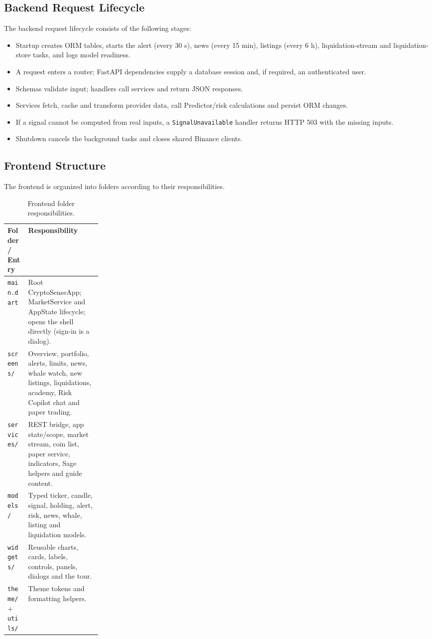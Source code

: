 \subsection{Backend Request Lifecycle}
The backend request lifecycle consists of the following stages:
\begin{itemize}
\item Startup creates ORM tables, starts the alert (every 30 s), news (every 15 min), listings (every 6 h), liquidation-stream and liquidation-store tasks, and logs model readiness.
\item A request enters a router; FastAPI dependencies supply a database session and, if required, an authenticated user.
\item Schemas validate input; handlers call services and return JSON responses.
\item Services fetch, cache and transform provider data, call Predictor/risk calculations and persist ORM changes.
\item If a signal cannot be computed from real inputs, a \texttt{SignalUnavailable} handler returns HTTP 503 with the missing inputs.
\item Shutdown cancels the background tasks and closes shared Binance clients.
\end{itemize}

\subsection{Frontend Structure}
The frontend is organized into folders according to their responsibilities.
\begin{table}[H]\centering
\renewcommand{\arraystretch}{1.3}
\begin{tabularx}{\linewidth}{|p{0.22\linewidth}|X|}\hline
\textbf{Folder / Entry} & \textbf{Responsibility}\\\hline
\texttt{main.dart} & Root CryptoSenseApp; MarketService and AppState lifecycle; opens the shell directly (sign-in is a dialog).\\\hline
\texttt{screens/} & Overview, portfolio, alerts, limits, news, whale watch, new listings, liquidations, academy, Risk Copilot chat and paper trading.\\\hline
\texttt{services/} & REST bridge, app state/scope, market stream, coin list, paper service, indicators, Sage helpers and guide content.\\\hline
\texttt{models/} & Typed ticker, candle, signal, holding, alert, risk, news, whale, listing and liquidation models.\\\hline
\texttt{widgets/} & Reusable charts, cards, labels, controls, panels, dialogs and the tour.\\\hline
\texttt{theme/} + \texttt{utils/} & Theme tokens and formatting helpers.\\\hline
\end{tabularx}
\caption{Frontend folder responsibilities.}\label{tab:frontend}
\end{table}

